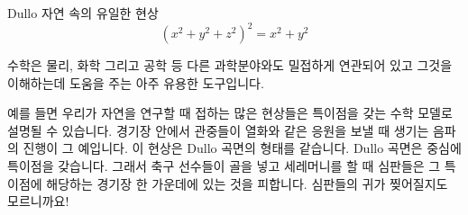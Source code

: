 \begin{surferPage}{Dullo}
자연 속의 유일한 현상\\
\smallskip
\[(x^2+ y^2+ z^2)^2	= x^2+ y^2\]

\singlespacing
수학은 물리, 화학 그리고 공학 등 다른 과학분야와도 밀접하게 연관되어 있고 그것을 이해하는데 도움을 주는 아주 유용한 도구입니다.

\singlespacing
예를 들면 우리가 자연을 연구할 때 접하는 많은 현상들은 특이점을 갖는 수학 모델로 설명될 수 있습니다. 
\singlespacing
경기장 안에서 관중들이 열화와 같은 응원을 보낼 때 생기는 음파의 진행이 그 예입니다. 이 현상은 Dullo 곡면의 형태를 같습니다. Dullo 곡면은 중심에 특이점을 갖습니다. 그래서 축구 선수들이 골을 넣고 세레머니를 할 때 심판들은 그 특이점에 해당하는 경기장 한 가운데에 있는 것을 피합니다. 심판들의 귀가 찢어질지도 모르니까요!
\end{surferPage}

